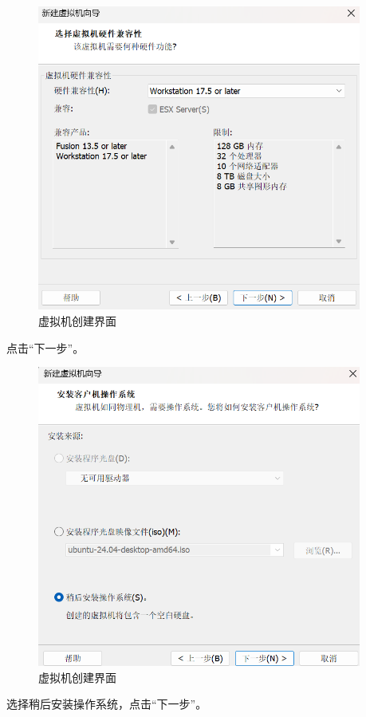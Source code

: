\documentclass[UTF8]{ctexart}
\begin{document}
\begin{figure}[H]
    \centering
    \includegraphics[width=0.95\textwidth]{picture/Screenshot 2024-10-14 112657.png}
    \caption{虚拟机创建界面}
\end{figure}
点击“下一步”。

\begin{figure}[H]
    \centering
    \includegraphics[width=0.95\textwidth]{picture/Screenshot 2024-10-14 112736.png}
    \caption{虚拟机创建界面}
\end{figure}
选择稍后安装操作系统，点击“下一步”。
\end{document}
